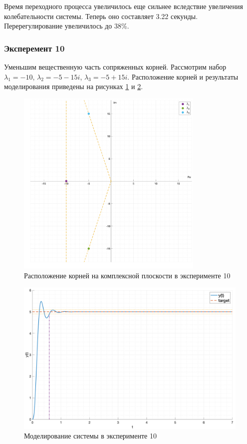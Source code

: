 Время переходного процесса увеличилось еще сильнее вследствие увеличения колебательности системы.
Теперь оно составляет 3.22 секунды. Перерегулирование увеличилось до 38\%.

\subsubsection{Эксперемент 10}
\label{task2_case10}
Уменьшим вещественную часть сопряженных корней. Рассмотрим набор
$\lambda_1 = -10$, $\lambda_2 = -5 - 15i$, $\lambda_3 = -5 + 15i$.
Расположение корней и результаты моделирования приведены на рисунках
\ref{fig:task_2_points10} и \ref{fig:task_2_case10}.

\begin{figure}
    \centering
    \includegraphics[width=0.8\textwidth]{media/plots/task2_points10.png}
    \caption{Расположение корней на комплексной плоскости в эксперименте 10}
    \label{fig:task_2_points10}
\end{figure}

\begin{figure}
    \centering
    \includegraphics[width=\textwidth]{media/plots/task2_case10.png}
    \caption{Моделирование системы в эксперименте 10}
    \label{fig:task_2_case10}
\end{figure}

